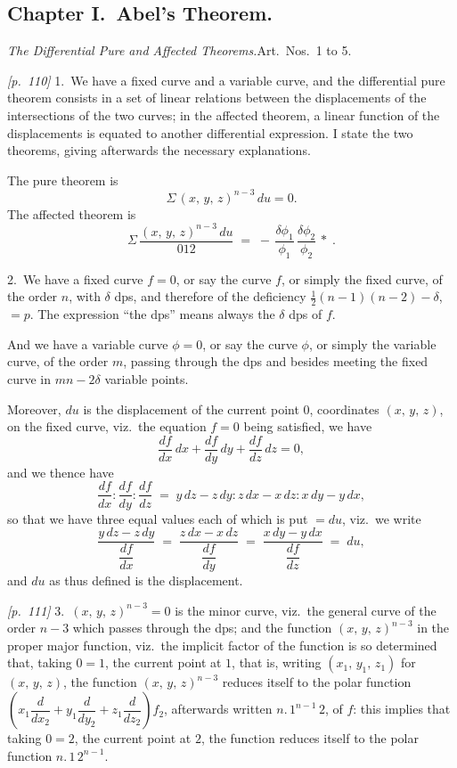 \documentclass[11pt,a4paper]{article}
\theoremstyle{plain}
\theoremstyle{definition}
\theoremstyle{remark}
\begin{document}
\subsection*{Chapter I.\ Abel's Theorem.}

\textit{The Differential Pure and Affected Theorems.}\quad Art.\ Nos.~1 to 5.

\noindent\textit{[p.~110]} 1.\ We have a fixed curve and a variable curve, and the differential pure theorem consists in a set of linear relations between the displacements of the intersections of the two curves; in the affected theorem, a linear function of the displacements is equated to another differential expression. I state the two theorems, giving afterwards the necessary explanations.

The pure theorem is
\[
\Sigma\,(x,\,y,\,z)^{n-3}\,du = 0.
\]
The affected theorem is
\[
\Sigma\,\frac{(x,\,y,\,z)^{n-3}\,du}{012}
\;=\; -\,\frac{\delta\phi_1}{\phi_1}\,\frac{\delta\phi_2}{\phi_2}\,*\;.
\]

2.\ We have a fixed curve $f = 0$, or say the curve $f$, or simply the fixed curve, of the order $n$, with $\delta$ dps, and therefore of the deficiency $\tfrac{1}{2}(n - 1)(n - 2) - \delta$, $= p$. The expression ``the dps'' means always the $\delta$ dps of $f$.

And we have a variable curve $\phi = 0$, or say the curve $\phi$, or simply the variable curve, of the order $m$, passing through the dps and besides meeting the fixed curve in $mn - 2\delta$ variable points.

Moreover, $du$ is the displacement of the current point $0$, coordinates $(x,\,y,\,z)$, on the fixed curve, viz.\ the equation $f = 0$ being satisfied, we have
\[
\frac{df}{dx}\,dx + \frac{df}{dy}\,dy + \frac{df}{dz}\,dz = 0,
\]
and we thence have
\[
\frac{df}{dx} : \frac{df}{dy} : \frac{df}{dz} \;=\; y\,dz - z\,dy : z\,dx - x\,dz : x\,dy - y\,dx,
\]
so that we have three equal values each of which is put $= du$, viz.\ we write
\[
\frac{y\,dz - z\,dy}{\dfrac{df}{dx}}
\;=\; \frac{z\,dx - x\,dz}{\dfrac{df}{dy}}
\;=\; \frac{x\,dy - y\,dx}{\dfrac{df}{dz}}
\;=\; du,
\]
and $du$ as thus defined is the displacement.

\noindent\textit{[p.~111]} 3.\ $(x,\,y,\,z)^{n-3} = 0$ is the minor curve, viz.\ the general curve of the order $n - 3$ which passes through the dps; and the function $(x,\,y,\,z)^{n-3}$ in the proper major function, viz.\ the implicit factor of the function is so determined that, taking $0 = 1$, the current point at $1$, that is, writing $(x_1,\,y_1,\,z_1)$ for $(x,\,y,\,z)$, the function $(x,\,y,\,z)^{n-3}$ reduces itself to the polar function $\left(x_1\dfrac{d}{dx_2} + y_1\dfrac{d}{dy_2} + z_1\dfrac{d}{dz_2}\right) f_2$, afterwards written $n.\,1^{n-1}\,2$, of $f$: this implies that taking $0 = 2$, the current point at $2$, the function reduces itself to the polar function $n.\,1\,2^{n-1}$.
\end{document}
